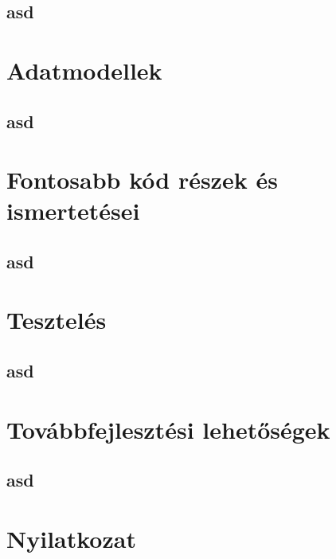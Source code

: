 \documentclass[12pt]{report}
\theoremstyle{definition}
\begin{document}
\section{asd}


\chapter{Adatmodellek}
\section{asd}


\chapter{Fontosabb kód részek és ismertetései}
\section{asd}


\chapter{Tesztelés}
\section{asd}


\chapter{Továbbfejlesztési lehetőségek}
\section{asd}



\chapter*{Nyilatkozat}



\end{document}
